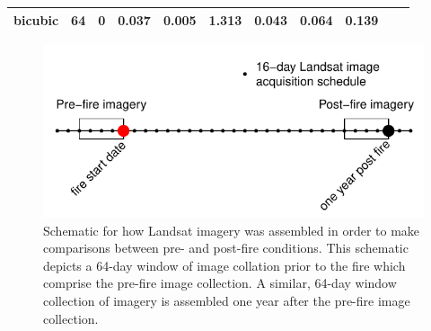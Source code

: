 \documentclass[twoside,12pt,final]{ucthesis-CA2012}
\begin{document}
\begin{ucmainmatter}
\begin{longtable}[]{@{}ccccccccccc@{}}
\begin{minipage}[t]{0.06\columnwidth}
bicubic\strut
\end{minipage} & \begin{minipage}[t]{0.08\columnwidth}\centering\strut
64\strut
\end{minipage} & \begin{minipage}[t]{0.08\columnwidth}\centering\strut
0\strut
\end{minipage} & \begin{minipage}[t]{0.07\columnwidth}\centering\strut
0.037\strut
\end{minipage} & \begin{minipage}[t]{0.07\columnwidth}\centering\strut
0.005\strut
\end{minipage} & \begin{minipage}[t]{0.07\columnwidth}\centering\strut
1.313\strut
\end{minipage} & \begin{minipage}[t]{0.05\columnwidth}\centering\strut
0.043\strut
\end{minipage} & \begin{minipage}[t]{0.05\columnwidth}\centering\strut
0.064\strut
\end{minipage} & \begin{minipage}[t]{0.05\columnwidth}\centering\strut
0.139\strut
\end{minipage}\tabularnewline
\bottomrule
\end{longtable}
\begin{figure}
\centering
\includegraphics[width=6.00000in]{figure/chap01/image-acquisition-algorithm.pdf}
\caption{Schematic for how Landsat imagery was assembled in order to
make comparisons between pre- and post-fire conditions. This schematic
depicts a 64-day window of image collation prior to the fire which
comprise the pre-fire image collection. A similar, 64-day window
collection of imagery is assembled one year after the pre-fire image
collection.}
\end{figure}
\begin{figure}

\end{figure}
\end{ucmainmatter}
\end{document}
